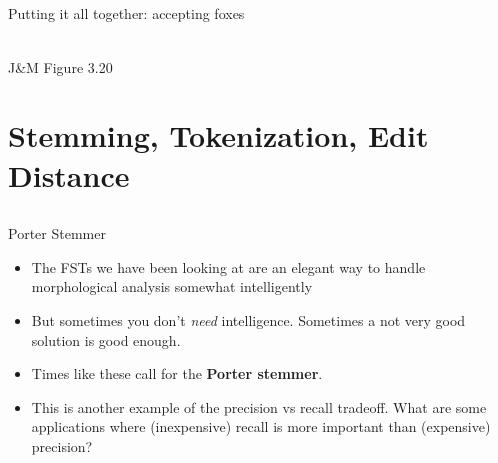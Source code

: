 \documentclass[9pt,xcolor=pdftex,dvipsnames,table]{beamer}
\begin{document}
\subsection{}
\begin{frame}{Putting it all together: accepting foxes}
\begin{center}
	\\
	{\large J\&M Figure 3.20}\\
\end{center}

\end{frame}

\section{Stemming, Tokenization, Edit Distance}

\subsection{}
\begin{frame}{Porter Stemmer}

\begin{itemize}
     \item The FSTs we have been looking at are an elegant way to handle morphological analysis somewhat intelligently
     \item But sometimes you don't \emph{need} intelligence.  Sometimes a not very good solution is good enough.
     \item Times like these call for the \textbf{Porter stemmer}. \pause
     \item This is another example of the precision vs recall tradeoff.  What are some applications where (inexpensive) recall is more important than (expensive) precision?
\end{itemize}
\end{frame}
\end{document}
